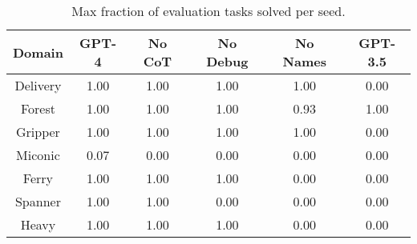 \begin{table}[h]
\centering
\begin{tabular}{cccccc} 
 \toprule
 \small
 \textbf{Domain} & \small GPT-4 & \small  No CoT & \small  No Debug & \small No Names & \small GPT-3.5 \\
 \midrule
 \small Delivery & 1.00 & 1.00 & 1.00 & 1.00 & 0.00 \\
 \small Forest & 1.00 & 1.00 & 1.00 & 0.93 & 1.00 \\
 \small Gripper & 1.00 & 1.00 & 1.00 & 1.00 & 0.00 \\ 
 \small Miconic & 0.07 & 0.00 & 0.00 & 0.00 & 0.00 \\ 
 \small Ferry & 1.00 & 1.00 & 1.00 & 0.00 & 0.00 \\
 \small Spanner & 1.00 & 1.00 & 0.00 & 0.00 & 0.00 \\ 
 \small Heavy & 1.00 & 1.00 & 1.00 & 0.00 & 0.00 \\ 
 \bottomrule
\end{tabular}
\caption{Max fraction of evaluation tasks solved per seed.}
\label{table:max_results}
\end{table}

